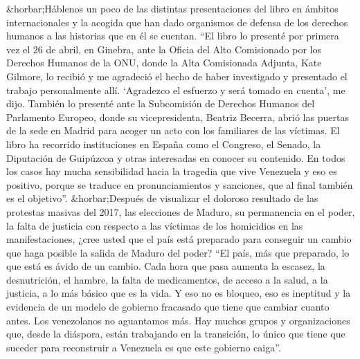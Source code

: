 \documentclass{article}%
\begin{document}
\newline%
%
\&horbar;Háblenos un poco de las distintas presentaciones del libro en ámbitos internacionales y la acogida que han dado organismos de defensa de los derechos humanos a las historias que en él se cuentan.%
\newline%
%
“El libro lo presenté por primera vez el 26 de abril, en Ginebra, ante la Oficia del Alto Comisionado por los Derechos Humanos de la ONU, donde la Alta Comisionada Adjunta, Kate Gilmore, lo recibió y me agradeció el hecho de haber investigado y presentado el trabajo personalmente allí. ‘Agradezco el esfuerzo y será tomado en cuenta’, me dijo. También lo presenté ante la Subcomisión de Derechos Humanos del Parlamento Europeo, donde su vicepresidenta, Beatriz Becerra, abrió las puertas de la sede en Madrid para acoger un acto con los familiares de las víctimas. El libro ha recorrido instituciones en España como el Congreso, el Senado, la Diputación de Guipúzcoa y otras interesadas en conocer su contenido. En todos los casos hay mucha sensibilidad hacia la tragedia que vive Venezuela y eso es positivo, porque se traduce en pronunciamientos y sanciones, que al final también es el objetivo”.%
\newline%
%
\&horbar;Después de visualizar el doloroso resultado de las protestas masivas del 2017, las elecciones de Maduro, su permanencia en el poder, la falta de justicia con respecto a las víctimas de los homicidios en las manifestaciones, ¿cree usted que el país está preparado para conseguir un cambio que haga posible la salida de Maduro del poder?%
\newline%
%
“El país, más que preparado, lo que está es ávido de un cambio. Cada hora que pasa aumenta la escasez, la desnutrición, el hambre, la falta de medicamentos, de acceso a la salud, a la justicia, a lo más básico que es la vida. Y eso no es bloqueo, eso es ineptitud y la evidencia de un modelo de gobierno fracasado que tiene que cambiar cuanto antes. Los venezolanos no aguantamos más. Hay muchos grupos y organizaciones que, desde la diáspora, están trabajando en la transición, lo único que tiene que suceder para reconstruir a Venezuela es que este gobierno caiga”.%
\newline%
%
\end{document}

